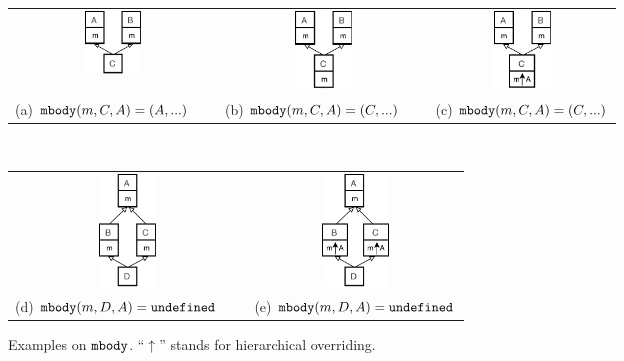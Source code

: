 \begin{figure}[t]
    \centering
    \vspace{-1ex}
    \begin{tabular}{ccc}
        \includegraphics[width=1.5cm]{pics/p1.pdf}\hspace{4pt} &
        \includegraphics[width=1.5cm]{pics/p2.pdf}\hspace{4pt} &
        \includegraphics[width=1.5cm]{pics/p3.pdf}\hspace{4pt} \\
        (a) $\texttt{mbody}(m,C,A) = (A,...)$\ \ \  & (b) $\texttt{mbody}(m,C,A) = (C,...)$\ \ \  & (c) $\texttt{mbody}(m,C,A) = (C,...)$
    \end{tabular} \\
   \begin{tabular}{cc}
    \includegraphics[height=3cm]{pics/p4.pdf}\hspace{4pt} &
    \includegraphics[height=3cm]{pics/p5.pdf}\hspace{4pt} \\ 
    (d) $\texttt{mbody}(m,D,A) = \texttt{undefined}$\ \ \  & (e) $\texttt{mbody}(m,D,A) = \texttt{undefined}$
   \end{tabular}
    \caption{Examples on $\texttt{mbody}$. ``$\uparrow$'' stands for hierarchical overriding.}\label{fig:examplesmbody}
\end{figure}

